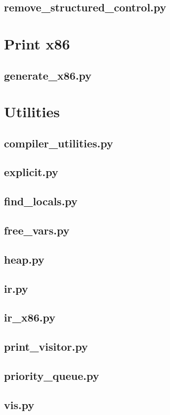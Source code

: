 \documentclass[a4paper,10pt]{article}
\begin{document}
\subsection{remove\_structured\_control.py}


\clearpage
\section{Print x86}

\subsection{generate\_x86.py}


\clearpage
\section*{Utilities}

\subsection{compiler\_utilities.py}


\subsection{explicit.py}


\subsection{find\_locals.py}


\subsection{free\_vars.py}


\subsection{heap.py}


\subsection{ir.py}


\subsection{ir\_x86.py}


\subsection{print\_visitor.py}


\subsection{priority\_queue.py}


\subsection{vis.py}

\end{document}
